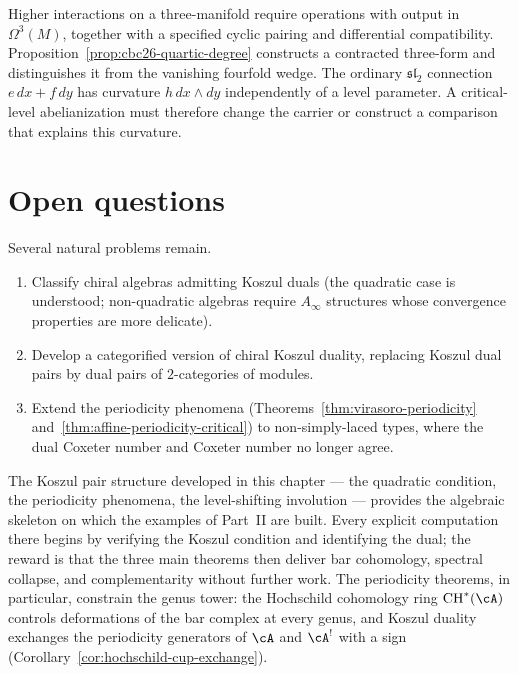 Higher interactions on a three-manifold require operations with output in $\Omega^3(M)$, together with a specified cyclic pairing and differential compatibility.
Proposition~\ref{prop:cbc26-quartic-degree} constructs a contracted three-form and distinguishes it from the vanishing fourfold wedge.
The ordinary $\mathfrak{sl}_2$ connection $e\,dx+f\,dy$ has curvature $h\,dx\wedge dy$ independently of a level parameter.
A critical-level abelianization must therefore change the carrier or construct a comparison that explains this curvature.

\section{Open questions}

Several natural problems remain.
\begin{enumerate}
\item Classify chiral algebras admitting Koszul duals (the quadratic
case is understood; non-quadratic algebras require $A_\infty$ structures
whose convergence properties are more delicate).
\item Develop a categorified version of chiral Koszul duality, replacing
Koszul dual pairs by dual pairs of $2$-categories of modules.
\item Extend the periodicity phenomena
(Theorems~\ref{thm:virasoro-periodicity}
and~\ref{thm:affine-periodicity-critical}) to non-simply-laced types,
where the dual Coxeter number and Coxeter number no longer agree.
\end{enumerate}

\medskip

The Koszul pair structure developed in this chapter --- the quadratic condition, the periodicity phenomena, the level-shifting involution --- provides the algebraic skeleton on which the examples of Part~II are built.  Every explicit computation there begins by verifying the Koszul condition and identifying the dual; the reward is that the three main theorems then deliver bar cohomology, spectral collapse, and complementarity without further work.  The periodicity theorems, in particular, constrain the genus tower: the Hochschild cohomology ring $\mathrm{CH}^*(\cA)$ controls deformations of the bar complex at every genus, and Koszul duality exchanges the periodicity generators of $\cA$ and $\cA^!$ with a sign (Corollary~\ref{cor:hochschild-cup-exchange}).
